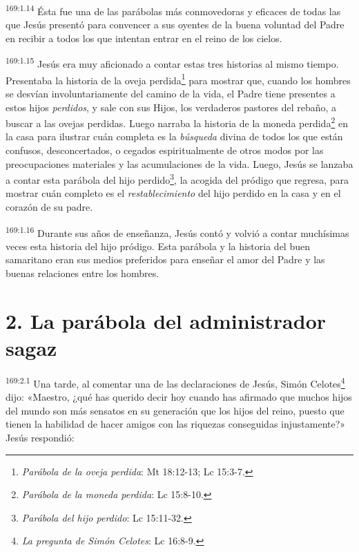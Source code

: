 \par 
\textsuperscript{169:1.14} Ésta fue una de las parábolas más conmovedoras y eficaces de todas las que Jesús presentó para convencer a sus oyentes de la buena voluntad del Padre en recibir a todos los que intentan entrar en el reino de los cielos.

\par 
\textsuperscript{169:1.15} Jesús era muy aficionado a contar estas tres historias al mismo tiempo. Presentaba la historia de la oveja perdida\footnote{\textit{Parábola de la oveja perdida}: Mt 18:12-13; Lc 15:3-7.} para mostrar que, cuando los hombres se desvían involuntariamente del camino de la vida, el Padre tiene presentes a estos hijos \textit{perdidos}, y sale con sus Hijos, los verdaderos pastores del rebaño, a buscar a las ovejas perdidas. Luego narraba la historia de la moneda perdida\footnote{\textit{Parábola de la moneda perdida}: Lc 15:8-10.} en la casa para ilustrar cuán completa es la \textit{búsqueda} divina de todos los que están confusos, desconcertados, o cegados espiritualmente de otros modos por las preocupaciones materiales y las acumulaciones de la vida. Luego, Jesús se lanzaba a contar esta parábola del hijo perdido\footnote{\textit{Parábola del hijo perdido}: Lc 15:11-32.}, la acogida del pródigo que regresa, para mostrar cuán completo es el \textit{restablecimiento} del hijo perdido en la casa y en el corazón de su padre.

\par 
\textsuperscript{169:1.16} Durante sus años de enseñanza, Jesús contó y volvió a contar muchísimas veces esta historia del hijo pródigo. Esta parábola y la historia del buen samaritano eran sus medios preferidos para enseñar el amor del Padre y las buenas relaciones entre los hombres.

\section*{2. La parábola del administrador sagaz}
\par 
\textsuperscript{169:2.1} Una tarde, al comentar una de las declaraciones de Jesús, Simón Celotes\footnote{\textit{La pregunta de Simón Celotes}: Lc 16:8-9.} dijo: «Maestro, ¿qué has querido decir hoy cuando has afirmado que muchos hijos del mundo son más sensatos en su generación que los hijos del reino, puesto que tienen la habilidad de hacer amigos con las riquezas conseguidas injustamente?» Jesús respondió:


